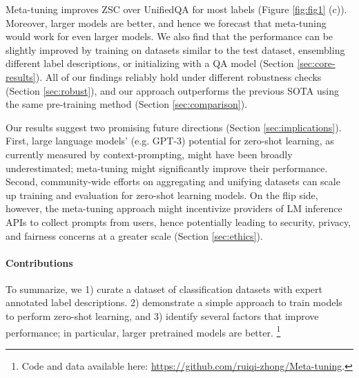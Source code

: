 Meta-tuning improves ZSC over UnifiedQA for most labels (Figure \ref{fig:fig1} (c)). Moreover, larger models are better, and hence we forecast that meta-tuning would work for even larger models. We also find that the performance can be slightly improved by training on datasets similar to the test dataset, ensembling different label descriptions, or initializing with a QA model  (Section \ref{sec:core-results}). 
All of our findings reliably hold under different robustness checks (Section \ref{sec:robust}), and our approach outperforms the previous SOTA \citet{yin-etal-2019-benchmarking} using the same pre-training method (Section \ref{sec:comparison}).

Our results suggest two promising future directions (Section \ref{sec:implications}).
First, large language models' (e.g. GPT-3) potential for zero-shot learning, as currently measured by context-prompting, might have been broadly underestimated; meta-tuning might significantly improve their performance. Second, community-wide efforts on aggregating and unifying datasets can scale up training and evaluation for zero-shot learning models. On the flip side, however, the meta-tuning approach might incentivize providers of LM inference APIs to collect prompts from users, hence potentially leading to security, privacy, and fairness concerns at a greater scale (Section \ref{sec:ethics}).

\paragraph{Contributions} To summarize, we 1) curate a dataset of classification datasets with expert annotated label descriptions. 2) demonstrate a simple approach to train models to perform zero-shot learning, and 3) identify several factors that improve performance; in particular, larger pretrained models are better.
\footnote{Code and data available here: \url{https://github.com/ruiqi-zhong/Meta-tuning}.}

